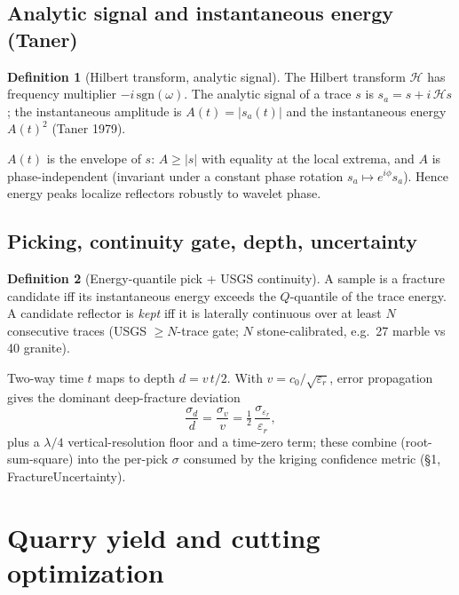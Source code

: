 \documentclass[11pt]{article}
\theoremstyle{definition}\newtheorem{definition}{Definition}[section]
\theoremstyle{plain}\newtheorem{theorem}{Theorem}[section]
\begin{document}
\subsection{Analytic signal and instantaneous energy (Taner)}
\begin{definition}[Hilbert transform, analytic signal]
The Hilbert transform $\mathcal H$ has frequency multiplier $-i\,\mathrm{sgn}(\omega)$. The analytic signal of a
trace $s$ is $s_a=s+i\,\mathcal H s$; the instantaneous amplitude is $A(t)=|s_a(t)|$ and the instantaneous
energy $A(t)^2$ (Taner 1979).
\end{definition}
\begin{proposition}
$A(t)$ is the envelope of $s$: $A\ge|s|$ with equality at the local extrema, and $A$ is phase-independent
(invariant under a constant phase rotation $s_a\mapsto e^{i\phi}s_a$). Hence energy peaks localize reflectors
robustly to wavelet phase.
\end{proposition}

\subsection{Picking, continuity gate, depth, uncertainty}
\begin{definition}[Energy-quantile pick + USGS continuity]
A sample is a fracture candidate iff its instantaneous energy exceeds the $Q$-quantile of the trace energy.
A candidate reflector is \emph{kept} iff it is laterally continuous over at least $N$ consecutive traces
(USGS $\ge N$-trace gate; $N$ stone-calibrated, e.g.\ 27 marble vs 40 granite).
\end{definition}
\begin{proposition}
Two-way time $t$ maps to depth $d=v\,t/2$. With $v=c_0/\sqrt{\varepsilon_r}$, error propagation gives the
dominant deep-fracture deviation
\[\frac{\sigma_d}{d}=\frac{\sigma_v}{v}=\tfrac12\,\frac{\sigma_{\varepsilon_r}}{\varepsilon_r},\]
plus a $\lambda/4$ vertical-resolution floor and a time-zero term; these combine (root-sum-square) into the
per-pick $\sigma$ consumed by the kriging confidence metric (\S1, FractureUncertainty).
\end{proposition}

\section{Quarry yield and cutting optimization}
\end{document}
